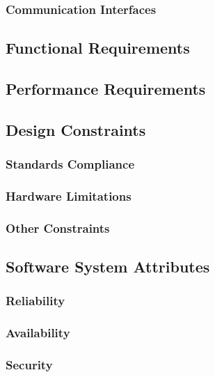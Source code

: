 \documentclass{paper}
\begin{document}
        \subsubsection{Communication Interfaces}
    
    \subsection{Functional Requirements}
    
    \subsection{Performance Requirements}
    
    \subsection{Design Constraints}
    
        \subsubsection{Standards Compliance}
        
        \subsubsection{Hardware Limitations}
        
        \subsubsection{Other Constraints}
    
    \subsection{Software System Attributes}
        
        \subsubsection{Reliability}
        
        \subsubsection{Availability}
        
        \subsubsection{Security}
        
\end{document}
